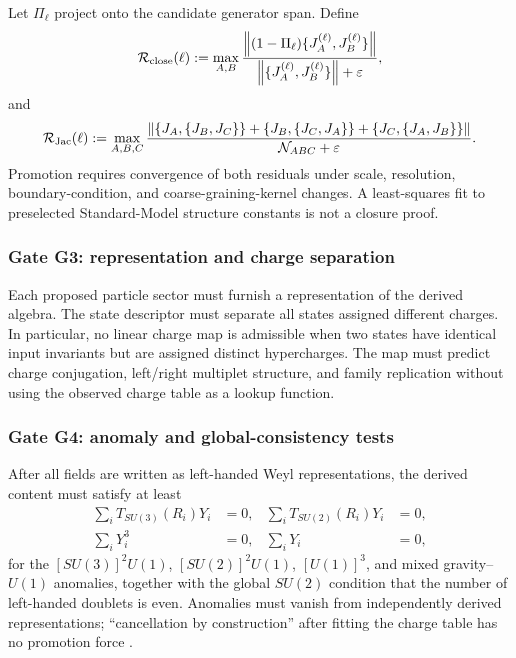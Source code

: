 Let \(\Pi_\ell\) project onto the candidate generator span.  Define
\begin{align}
    \mathcal R_{\rm close}(\ell)
    :=
    \max_{A,B}
    \frac{
        \left\|
        (1-\Pi_\ell)\{J_A^{(\ell)},J_B^{(\ell)}\}
        \right\|
    }{
        \left\|
        \{J_A^{(\ell)},J_B^{(\ell)}\}
        \right\|+\varepsilon
    },
    \label{eq:rt_gauge_closure_residual}
\end{align}
and
\begin{align}
    \mathcal R_{\rm Jac}(\ell)
    :=
    \max_{A,B,C}
    \frac{
        \left\|
        \{J_A,\{J_B,J_C\}\}
        +\{J_B,\{J_C,J_A\}\}
        +\{J_C,\{J_A,J_B\}\}
        \right\|
    }{
        \mathcal N_{ABC}+\varepsilon
    }.
    \label{eq:rt_gauge_jacobi_residual}
\end{align}
Promotion requires convergence of both residuals under scale, resolution,
boundary-condition, and coarse-graining-kernel changes.  A least-squares fit to
preselected Standard-Model structure constants is not a closure proof.

\subsubsection{Gate G3: representation and charge separation}

Each proposed particle sector must furnish a representation of the derived
algebra.  The state descriptor must separate all states assigned different
charges.  In particular, no linear charge map is admissible when two states
have identical input invariants but are assigned distinct hypercharges.  The
map must predict charge conjugation, left/right multiplet structure, and family
replication without using the observed charge table as a lookup function.

\subsubsection{Gate G4: anomaly and global-consistency tests}

After all fields are written as left-handed Weyl representations, the derived
content must satisfy at least
\begin{align}
    \sum_i T_{SU(3)}(R_i)Y_i&=0,
    &
    \sum_i T_{SU(2)}(R_i)Y_i&=0,
    \\
    \sum_i Y_i^3&=0,
    &
    \sum_i Y_i&=0,
    \label{eq:rt_gauge_anomaly_gates}
\end{align}
for the \([SU(3)]^2U(1)\), \([SU(2)]^2U(1)\), \([U(1)]^3\), and mixed
gravity--\(U(1)\) anomalies, together with the global \(SU(2)\) condition that the number of left-handed doublets is even.  Anomalies must vanish from independently derived representations;
``cancellation by construction'' after fitting the charge table has no
promotion force \cite{Weinberg1967,PDG2024}.

